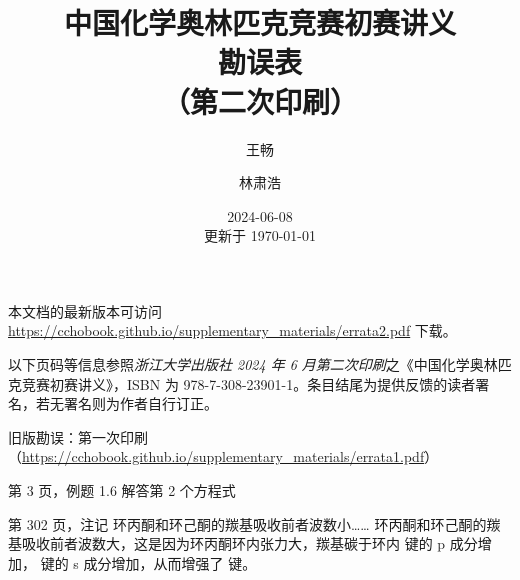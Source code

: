 \documentclass{errata}
\title{中国化学奥林匹克竞赛初赛讲义 \\ {\bfseries 勘误表} \\ （第二次印刷）}
\author{王畅 \and 林肃浩}
\date{2024-06-08 \\ 更新于 \today}
\begin{document}
    \maketitle
    本文档的最新版本可访问 \url{https://cchobook.github.io/supplementary_materials/errata2.pdf} 下载。

    以下页码等信息参照\emph{浙江大学出版社 2024 年 6 月第二次印刷}之《中国化学奥林匹克竞赛初赛讲义》，ISBN 为 978-7-308-23901-1。条目结尾为提供反馈的读者署名，若无署名则为作者自行订正。
    
    旧版勘误：第一次印刷（\url{https://cchobook.github.io/supplementary_materials/errata1.pdf}）

    \begin{Errata}
        \item[第 3 页，例题 1.6 解答第 2 个方程式]
            \Orig {}
            \Corr {}
        \item[第 302 页，注记]
            \Orig 环丙酮和环己酮的羰基吸收前者波数小……
            \Corr 环丙酮和环己酮的羰基吸收前者波数大，这是因为环丙酮环内张力大，羰基碳于环内  键的 p 成分增加， 键的 s 成分增加，从而增强了  键。
    \end{Errata}

    \renewcommand{\em}{\itshape}
    \renewcommand*{\bibfont}{\footnotesize}
    \renewcommand{\refname}{参考文献}
    \renewcommand{\bibname}{参考文献}
    \printbibliography
\end{document}
